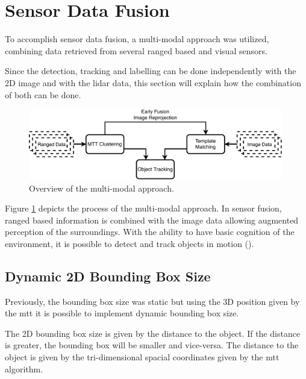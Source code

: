 \section{Sensor Data Fusion}

To accomplish sensor data fusion, a multi-modal approach was utilized, combining data retrieved from several ranged based and visual sensors.

Since the detection, tracking and labelling can be done independently with the 2D image and with the \gls{lidar} data, this section will explain how the combination of both can be done.

\begin{figure}[htp]
	
	\centering
	\includegraphics[width=0.99\textwidth]{caplabel/imgs/multimodal}
	
	\caption{Overview of the multi-modal approach. }
	\label{fig:multimodal}
	
\end{figure}

Figure \ref{fig:multimodal} depicts the process of the multi-modal approach. In sensor fusion, ranged based information is combined with the image data allowing augmented perception of the surroundings. With the ability to have basic cognition of the environment, it is possible to detect and track objects in motion (\cite{Spinello2010}).

\subsection{Dynamic 2D Bounding Box Size}

Previously, the bounding box size was static but using the 3D position given by the \gls{mtt} it is possible to implement dynamic bounding box size.

The 2D bounding box size is given by the distance to the object. If the distance is greater, the bounding box will be smaller and vice-versa. The distance to the object is given by the tri-dimensional spacial coordinates given by the \gls{mtt} algorithm.


